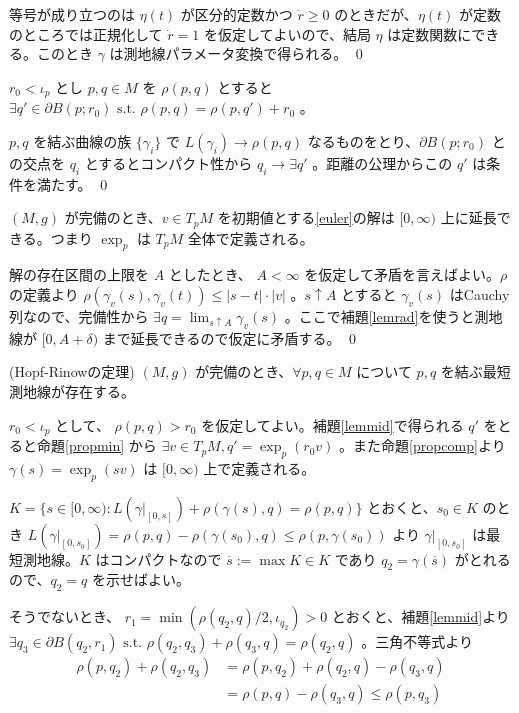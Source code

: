 \documentclass[dvipdfmx,a4paper]{jsreport}
\theoremstyle{definition}
\newcommand{\der}{\partial}
\renewcommand{\bar}{\overline}
\begin{document}
等号が成り立つのは $\eta(t)$ が区分的定数かつ $\dot{r}\geq 0$ のときだが、$\eta(t)$ が定数のところでは正規化して $\dot{r}=1$ を仮定してよいので、結局 $\eta$ は定数関数にできる。このとき $\gamma$ は測地線パラメータ変換で得られる。 \qed


\lem\label{lemmid} $r_0<\iota_p$ とし $p,q\in M$ を $\rho(p,q)$ とすると $\exists q' \in \der B(p;r_0)\mbox{ s.t. }\rho(p,q)=\rho(p,q')+r_0$ 。

\prf
$p,q$ を結ぶ曲線の族 $\{\gamma_i\}$ で $L(\gamma_i)\to \rho(p,q)$ なるものをとり、$\der B(p;r_0)$ との交点を $q_i$ とするとコンパクト性から $q_i \to \exists q'$ 。距離の公理からこの $q'$ は条件を満たす。 \qed


\prop\label{propcomp} $(M,g)$ が完備のとき、$v \in T_pM$ を初期値とする\eqref{euler}の解は $[0,\infty)$ 上に延長できる。つまり $\exp_p$ は $T_pM$ 全体で定義される。

\prf 解の存在区間の上限を $A$ としたとき、 $A<\infty$ を仮定して矛盾を言えばよい。$\rho$ の定義より $\rho(\gamma_v(s),\gamma_v(t)) \leq |s-t|\cdot |v|$ 。$s \uparrow A$ とすると $\gamma_v(s)$ はCauchy列なので、完備性から $\exists q=\lim_{s \uparrow A}\gamma_v(s)$ 。ここで補題\ref{lemrad}を使うと測地線が $[0,A+\delta)$ まで延長できるので仮定に矛盾する。 \qed

\thm\label{thmhopf} (Hopf-Rinowの定理) $(M,g)$ が完備のとき、$\forall p,q \in M$ について $p,q$ を結ぶ最短測地線が存在する。

\prf $r_0<\iota_p$ として、 $\rho(p,q)>r_0$ を仮定してよい。補題\ref{lemmid}で得られる $q'$ をとると命題\ref{propmin} から $\exists v \in T_pM,q'=\exp_p(r_0v)$ 。また命題\ref{propcomp}より $\gamma(s)=\exp_p(sv)$ は $[0,\infty)$ 上で定義される。

$K=\{s \in [0,\infty) \colon L(\gamma|_{[0,s]})+\rho(\gamma(s),q)=\rho(p,q)\}$ とおくと、$s_0 \in K$ のとき $L(\gamma|_{[0,s_0]})=\rho(p,q)-\rho(\gamma(s_0),q) \leq \rho(p,\gamma(s_0))$ より $\gamma|_{[0,s_0]}$ は最短測地線。$K$ はコンパクトなので $\bar{s}:= \max K \in K$ であり $q_2=\gamma(\bar{s})$ がとれるので、$q_2=q$ を示せばよい。

そうでないとき、 $r_1=\min(\rho(q_2,q)/2,\iota_{q_2})>0$ とおくと、補題\ref{lemmid}より $\exists q_3 \in \der B(q_2,r_1)\mbox{ s.t. }\rho(q_2,q_3)+\rho(q_3,q)=\rho(q_2,q)$ 。三角不等式より 
\begin{align*}
    \rho(p,q_2)+\rho(q_2,q_3)&=\rho(p,q_2)+\rho(q_2,q)-\rho(q_3,q) \\
    &=\rho(p,q)-\rho(q_3,q) \leq \rho(p,q_3)
\end{align*}
\end{document}
